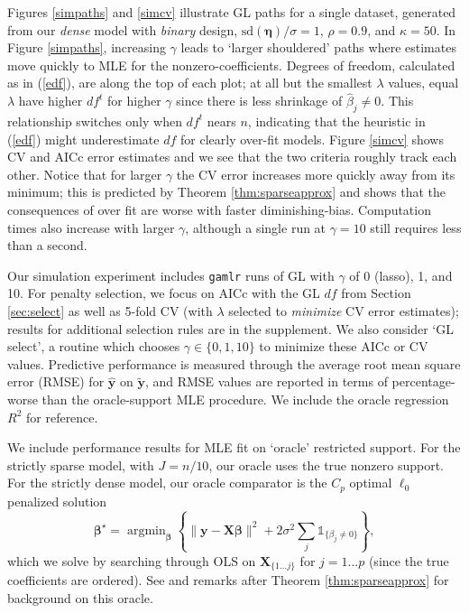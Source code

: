 \documentclass[12pt]{article}
\newcommand{\bs}[1]{\boldsymbol{#1}}
\newcommand{\mr}[1]{\mathrm{#1}}
\newcommand{\bm}[1]{\mathbf{#1}}
\newcommand{\ds}[1]{\mathds{#1}}
\DeclareMathOperator*{\argmin}{argmin}
\begin{document}
Figures \ref{simpaths} and \ref{simcv} illustrate GL paths for a single
dataset, generated from our {\it dense} model with {\it binary} design,   $\mr{sd}(\bm{\eta})/\sigma=1$,  $\rho=0.9$, and  ${\kappa}=50$. In Figure
\ref{simpaths}, increasing $\gamma$ leads to `larger shouldered' paths where
estimates move quickly to MLE for the nonzero-coefficients. Degrees of
freedom, calculated as in (\ref{edf}), are along the top of each plot; at all but the smallest $\lambda$ values, equal
$\lambda$ have higher $df^t$ for higher $\gamma$ since there is less shrinkage
of $\hat\beta_j\neq0$.   This relationship switches only when $df^t$
nears $n$, indicating that the heuristic in (\ref{edf}) might underestimate $df$ for clearly over-fit models.
Figure \ref{simcv} shows CV and AICc error estimates and we see that 
the two criteria roughly track each other.  Notice that
for larger $\gamma$ the CV error increases more quickly away from
its minimum; this is predicted by Theorem \ref{thm:sparseapprox} and shows that the consequences of over fit are worse with
faster diminishing-bias.  Computation times also increase with larger $\gamma$, although a
single run at $\gamma=10$ still requires less than a second.


Our simulation experiment includes \texttt{gamlr} runs of GL with $\gamma$
of 0 (lasso), 1, and 10. For penalty selection, we focus on AICc with the GL $df$
from Section \ref{sec:select} as well as 5-fold CV (with $\lambda$ selected to
{\it minimize} CV error estimates); results for additional selection rules are in the supplement. 
We also consider `GL select', a routine which chooses $\gamma \in \{0,1,10\}$ to minimize these AICc or CV values.
Predictive performance is measured through the average root
mean square error (RMSE) for  $\bm{\hat y}$ on $\bm{\tilde y}$, and RMSE values are reported  in
terms of percentage-worse than the oracle-support MLE procedure.  We include the
oracle regression $R^2$ for reference.


We include performance results for MLE fit on `oracle' restricted support.  For the strictly sparse model, with $J=n/10$, our oracle uses the true nonzero support.  For the strictly dense model, our oracle comparator is the $C_p$ optimal $\ell_0$ penalized solution
\begin{equation}\label{l0oracle}
\bs{\beta}^{\star} = \argmin_{\bs{\beta}} \left\{ \|\bm{y}-\bm{X}\bs{\beta}\|^2 + 2\sigma^2\sum_j
\ds{1}_{\{\beta_j\neq0\}}\right\},
\end{equation} which we solve by searching through
OLS on $\bm{X}_{\{1\ldots j\}}$ for $j=1\ldots p$ (since the true coefficients are ordered).
See \cite{mallows_comments_1973} and remarks after Theorem \ref{thm:sparseapprox} for background on this oracle.
\end{document}
